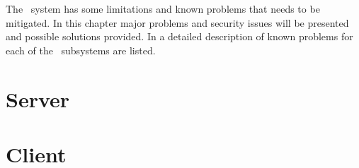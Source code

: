The \appName\ system has some limitations and known problems that needs to be
mitigated. In this chapter major problems and security issues will be presented
and possible solutions provided. In  a detailed
description of known problems for each of the \appName\ subsystems are listed.

\section{Server}


\section{Client}


